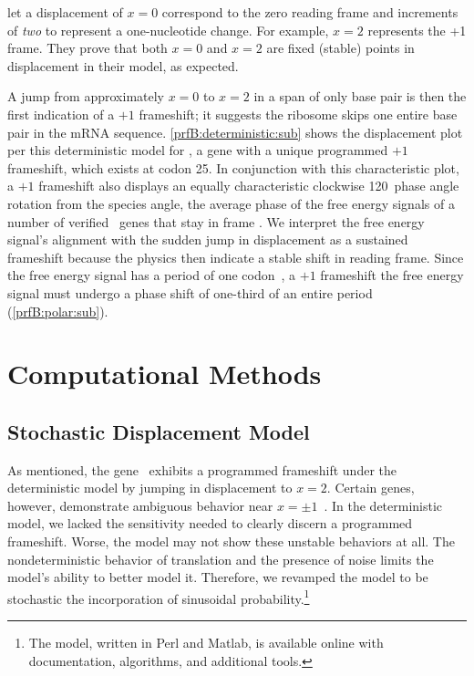 \documentclass[12pt]{article}
\begin{document}
\citeauthor{lalit:mechanics} let a displacement of $x = 0$ correspond
to the zero reading frame and increments of \emph{two} to represent a
one-nucleotide change. For example, $x =2$ represents the +1 frame.
They prove that both $x = 0$ and $x = 2$ are fixed
(stable) points in displacement in their model, as expected.

A jump from approximately $x = 0$ to $x = 2$ in a span of only
base pair is then the first indication of a $+1$ frameshift; it
suggests the ribosome skips one entire base pair in the mRNA sequence.
\autoref{prfB:deterministic:sub} shows the displacement plot per this
deterministic model for \prfB, a gene with a unique programmed $+1$
frameshift, which exists at codon 25. In conjunction with this
characteristic plot, a $+1$ frameshift also displays an equally
characteristic clockwise 120\degree\ phase angle rotation from the
species angle, the average phase of the free energy signals of a
number of verified \ecoli\ genes that stay in frame
\cite{lalit:mechanics}.  We interpret the free energy signal's
alignment with the sudden jump in displacement as a sustained
frameshift because the physics then indicate a stable shift in
reading frame. Since the free energy signal has a period of one
codon~\cite{lalit:mechanics}, a $+1$ frameshift the free energy signal
must undergo a phase shift of one-third of an entire period
(\autoref{prfB:polar:sub}).

\section{Computational Methods}

\subsection{Stochastic Displacement Model}
\label{stochastic}

As mentioned, the gene \prfB\ exhibits a programmed frameshift under
the deterministic model by jumping in displacement to $x=2$.  Certain
genes, however, demonstrate ambiguous behavior near
$x = \pm 1$~\cite{lalit:mechanics}.  In the deterministic model, we lacked the
sensitivity needed to clearly discern a programmed
frameshift. Worse, the model may not show these unstable
behaviors at all. The nondeterministic
behavior of translation and the presence of noise limits the model's
ability to better model it. Therefore, we revamped the model to be
stochastic the incorporation of sinusoidal probability.\footnote{
  The model, written in Perl and Matlab, is available online with
  documentation, algorithms, and additional tools.
}
\end{document}
